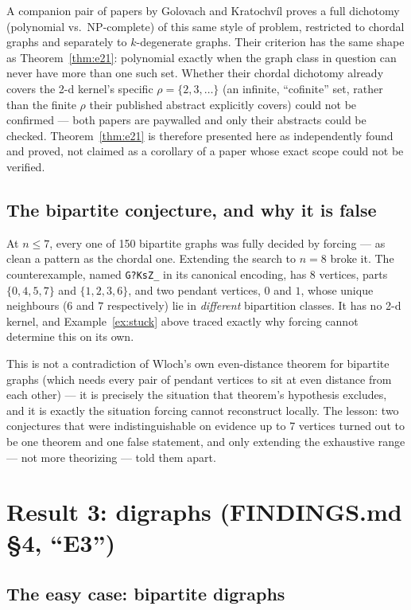 \documentclass[11pt]{article}
\theoremstyle{plain}
\theoremstyle{definition}
\theoremstyle{remark}
\begin{document}
A companion pair of papers by Golovach and Kratochv\'il proves a full dichotomy
(polynomial vs.\ NP-complete) of this same style of problem, restricted to chordal
graphs and separately to $k$-degenerate graphs. Their criterion has the same shape as
Theorem~\ref{thm:e21}: polynomial exactly when the graph class in question can never
have more than one such set. Whether their chordal dichotomy already covers the
2-d kernel's specific $\rho = \{2,3,\dots\}$ (an infinite, ``cofinite'' set, rather than
the finite $\rho$ their published abstract explicitly covers) could not be confirmed
--- both papers are paywalled and only their abstracts could be checked. Theorem~\ref{thm:e21}
is therefore presented here as independently found and proved, not claimed as a
corollary of a paper whose exact scope could not be verified.

\subsection{The bipartite conjecture, and why it is false}

At $n \le 7$, every one of 150 bipartite graphs was fully decided by forcing — as
clean a pattern as the chordal one. Extending the search to $n = 8$ broke it. The
counterexample, named \texttt{G?KsZ\_} in its canonical encoding, has 8 vertices, parts
$\{0,4,5,7\}$ and $\{1,2,3,6\}$, and two pendant vertices, $0$ and $1$, whose unique
neighbours ($6$ and $7$ respectively) lie in \emph{different} bipartition classes. It
has no 2-d kernel, and Example~\ref{ex:stuck} above traced exactly why forcing cannot
determine this on its own.

This is not a contradiction of Wloch's own even-distance theorem for bipartite graphs
(which needs every pair of pendant vertices to sit at even distance from each other) —
it is precisely the situation that theorem's hypothesis excludes, and it is exactly
the situation forcing cannot reconstruct locally. The lesson: two conjectures that
were indistinguishable on evidence up to 7 vertices turned out to be one theorem and
one false statement, and only extending the exhaustive range — not more theorizing —
told them apart.

\section{Result 3: digraphs (FINDINGS.md \S4, ``E3'')}
\label{sec:e3}

\subsection{The easy case: bipartite digraphs}
\end{document}
